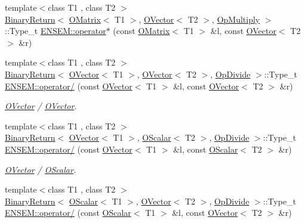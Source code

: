 \begin{DoxyCompactItemize}
\item 
{\footnotesize template$<$class T1 , class T2 $>$ }\\\mbox{\hyperlink{structENSEM_1_1BinaryReturn}{Binary\+Return}}$<$ \mbox{\hyperlink{classENSEM_1_1OMatrix}{O\+Matrix}}$<$ T1 $>$, \mbox{\hyperlink{classENSEM_1_1OVector}{O\+Vector}}$<$ T2 $>$, \mbox{\hyperlink{structENSEM_1_1OpMultiply}{Op\+Multiply}} $>$\+::Type\+\_\+t \mbox{\hyperlink{group__obsvector_ga7ba413a9121973912be1ff1686cec922}{E\+N\+S\+E\+M\+::operator$\ast$}} (const \mbox{\hyperlink{classENSEM_1_1OMatrix}{O\+Matrix}}$<$ T1 $>$ \&l, const \mbox{\hyperlink{classENSEM_1_1OVector}{O\+Vector}}$<$ T2 $>$ \&r)
\item 
{\footnotesize template$<$class T1 , class T2 $>$ }\\\mbox{\hyperlink{structENSEM_1_1BinaryReturn}{Binary\+Return}}$<$ \mbox{\hyperlink{classENSEM_1_1OVector}{O\+Vector}}$<$ T1 $>$, \mbox{\hyperlink{classENSEM_1_1OVector}{O\+Vector}}$<$ T2 $>$, \mbox{\hyperlink{structENSEM_1_1OpDivide}{Op\+Divide}} $>$\+::Type\+\_\+t \mbox{\hyperlink{group__obsvector_ga85053dcc452aa903b53e9b24dc0d5fb9}{E\+N\+S\+E\+M\+::operator/}} (const \mbox{\hyperlink{classENSEM_1_1OVector}{O\+Vector}}$<$ T1 $>$ \&l, const \mbox{\hyperlink{classENSEM_1_1OVector}{O\+Vector}}$<$ T2 $>$ \&r)
\begin{DoxyCompactList}\small\item\em \mbox{\hyperlink{classENSEM_1_1OVector}{O\+Vector}} / \mbox{\hyperlink{classENSEM_1_1OVector}{O\+Vector}}. \end{DoxyCompactList}\item 
{\footnotesize template$<$class T1 , class T2 $>$ }\\\mbox{\hyperlink{structENSEM_1_1BinaryReturn}{Binary\+Return}}$<$ \mbox{\hyperlink{classENSEM_1_1OVector}{O\+Vector}}$<$ T1 $>$, \mbox{\hyperlink{classENSEM_1_1OScalar}{O\+Scalar}}$<$ T2 $>$, \mbox{\hyperlink{structENSEM_1_1OpDivide}{Op\+Divide}} $>$\+::Type\+\_\+t \mbox{\hyperlink{group__obsvector_ga7000d5ea0ebcbe74abe855326d6e82cd}{E\+N\+S\+E\+M\+::operator/}} (const \mbox{\hyperlink{classENSEM_1_1OVector}{O\+Vector}}$<$ T1 $>$ \&l, const \mbox{\hyperlink{classENSEM_1_1OScalar}{O\+Scalar}}$<$ T2 $>$ \&r)
\begin{DoxyCompactList}\small\item\em \mbox{\hyperlink{classENSEM_1_1OVector}{O\+Vector}} / \mbox{\hyperlink{classENSEM_1_1OScalar}{O\+Scalar}}. \end{DoxyCompactList}\item 
{\footnotesize template$<$class T1 , class T2 $>$ }\\\mbox{\hyperlink{structENSEM_1_1BinaryReturn}{Binary\+Return}}$<$ \mbox{\hyperlink{classENSEM_1_1OScalar}{O\+Scalar}}$<$ T1 $>$, \mbox{\hyperlink{classENSEM_1_1OVector}{O\+Vector}}$<$ T2 $>$, \mbox{\hyperlink{structENSEM_1_1OpDivide}{Op\+Divide}} $>$\+::Type\+\_\+t \mbox{\hyperlink{group__obsvector_gaf4f1f6a048cad788e11294a211380fab}{E\+N\+S\+E\+M\+::operator/}} (const \mbox{\hyperlink{classENSEM_1_1OScalar}{O\+Scalar}}$<$ T1 $>$ \&l, const \mbox{\hyperlink{classENSEM_1_1OVector}{O\+Vector}}$<$ T2 $>$ \&r)

\end{DoxyCompactItemize}
